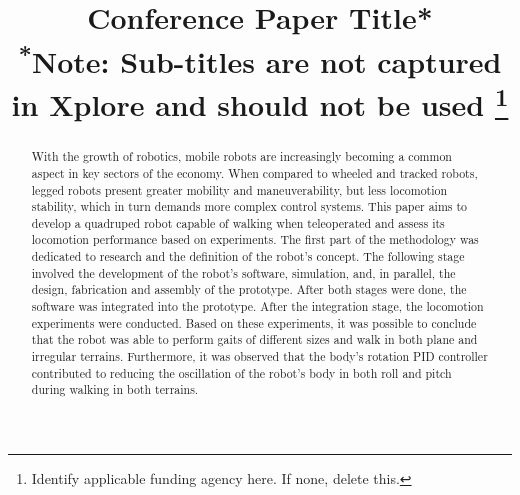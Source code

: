 \documentclass[conference]{IEEEtran}
\begin{document}
\title{Conference Paper Title*\\
{\footnotesize \textsuperscript{*}Note: Sub-titles are not captured in Xplore and
should not be used}
\thanks{Identify applicable funding agency here. If none, delete this.}
}

\author{
\and
{}
\and
{}
}

\maketitle

\begin{abstract}
With the growth of robotics, mobile robots are increasingly becoming a common aspect in key sectors of the economy. When compared to wheeled and tracked robots, legged robots present greater mobility and maneuverability, but less locomotion stability, which in turn demands more complex control systems. This paper aims to develop a quadruped robot capable of walking when teleoperated and assess its locomotion performance based on experiments. The first part of the methodology was dedicated to research and the definition of the robot's concept. The following stage involved the development of the robot's software, simulation, and, in parallel, the design, fabrication and assembly of the prototype. After both stages were done, the software was integrated into the prototype. After the integration stage, the locomotion experiments were conducted. Based on these experiments, it was possible to conclude that the robot was able to perform gaits of different sizes and walk in both plane and irregular terrains. Furthermore, it was observed that the body's rotation PID controller contributed to reducing the oscillation of the robot's body in both roll and pitch during walking in both terrains.
\end{abstract}
\end{document}
